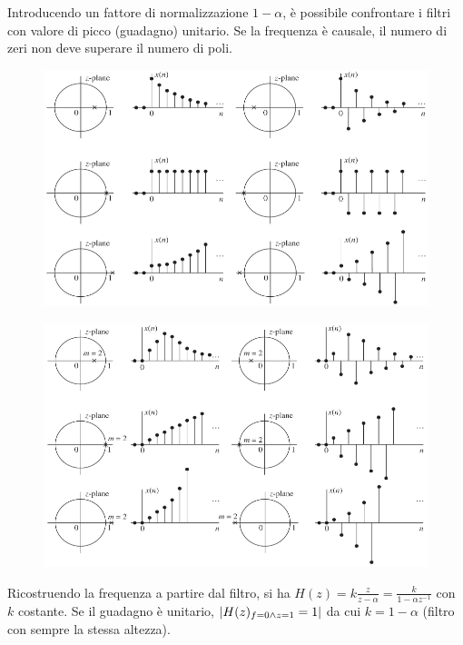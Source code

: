Introducendo un fattore di normalizzazione $1 - \alpha$, è possibile confrontare i filtri con valore di picco (guadagno) unitario. Se la frequenza è causale, il numero di zeri non deve superare il numero di poli.

\begin{figure}[h]
	\centering
	\includegraphics[scale=0.45]{Lezioni/Immagini/polizeri1}
\end{figure}
\begin{figure}[h]
	\centering
	\includegraphics[scale=0.45]{Lezioni/Immagini/polizeri2}
	\vspace{0.5cm}
	\hspace*{0.5cm} 
\end{figure}

\newpage
Ricostruendo la frequenza a partire dal filtro, si ha $H(z) = k \frac{z}{z - \alpha} = \frac{k}{1 - \alpha z^{-1}}$ con $k$ costante. Se il guadagno è unitario, $\left|H(z)_{f=0 \land z=1} = 1\right|$ da cui $k = 1 - \alpha$ (filtro con sempre la stessa altezza).

